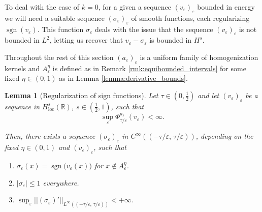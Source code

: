 \documentclass{article}
\newtheorem{Lemma}[Theorem]{Lemma}
\theoremstyle{definition}
\newcommand{\R}{\mathbb{R}}
\newcommand{\e}{\varepsilon}
\def\e{\varepsilon}
\newcommand{\sgn}{\operatorname{sgn}}
\begin{document}
To deal with the case of $k=0$, for a given a sequence $(v_\e)_\e$ bounded in energy we will need a suitable sequence $(\sigma_\e)_{\e}$ of smooth functions, each regularizing $\sgn(v_\e)$. This function $\sigma_\e$ deals with the issue that the sequence $(v_\e)_\e$ is not bounded in $L^2$, letting us recover that $v_\e-\sigma_\e$ is bounded in $H^s$.

Throughout the rest of this section $(a_\e)_\e$ is a uniform family of homogenization kernels and $A_\e^\eta$ is defined as in Remark \ref{rmk:equibounded_intervals} for some fixed $\eta\in (0,1)$ as in Lemma \ref{lemma:derivative_bounds}.


\begin{Lemma}[Regularization of sign functions]
\label{lemma:sign_v_regularization} 
    Let $\tau\in (0,\frac{1}{2})$ and let 
    $(v_\e)_{\e}$ be a sequence in $H^{s}_{\operatorname{loc}}(\R)$,  $s\in (\frac{1}{2},1)$, such that \[\sup_\e\Phi^{a_{\scriptstyle \e}}_{\tau /\e}(v_\e)< \infty.\]
    
    Then, there exists a sequence $(\sigma_\e)_{\e}$ in $ C^\infty ((-\tau/\e,\,\tau/\e ))$, depending on the fixed $\eta\in (0,1)$ and $(v_\e)_\e$, such that 
    \begin{enumerate}
        \item[(i)] $\sigma_\e(x) = \sgn\big(v_\e(x)\big) $ for $ x\notin A_\e^\eta$.
        \item[(ii)] $|\sigma_\e|\leq 1$ everywhere.
        \item[(iii)] $\displaystyle \sup_\e||(\sigma_\e)'||_{L^\infty\left(\left(- \tau/\e, \, \tau/\e\right) \right)}<+\infty$.
    \end{enumerate}
\end{Lemma}
\end{document}

